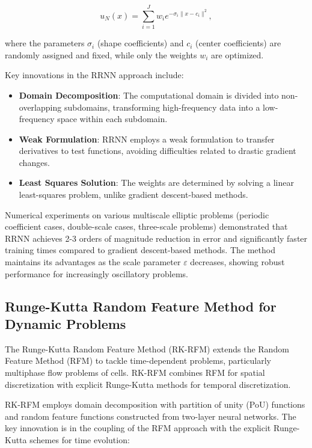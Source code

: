\documentclass[11pt]{article}
\begin{document}
\begin{equation}
    u_N(x) = \sum_{i=1}^J w_i e^{-\sigma_i\|x-c_i\|^2},
\end{equation}

where the parameters $\sigma_i$ (shape coefficients) and $c_i$ (center coefficients) are randomly assigned and fixed, while only the weights $w_i$ are optimized.

Key innovations in the RRNN approach include:
\begin{itemize}
    \item \textbf{Domain Decomposition}: The computational domain is divided into non-overlapping subdomains, transforming high-frequency data into a low-frequency space within each subdomain.
    
    \item \textbf{Weak Formulation}: RRNN employs a weak formulation to transfer derivatives to test functions, avoiding difficulties related to drastic gradient changes.
    
    \item \textbf{Least Squares Solution}: The weights are determined by solving a linear least-squares problem, unlike gradient descent-based methods.
\end{itemize}

Numerical experiments on various multiscale elliptic problems (periodic coefficient cases, double-scale cases, three-scale problems) demonstrated that RRNN achieves 2-3 orders of magnitude reduction in error and significantly faster training times compared to gradient descent-based methods. The method maintains its advantages as the scale parameter $\varepsilon$ decreases, showing robust performance for increasingly oscillatory problems.

\subsection{Runge-Kutta Random Feature Method for Dynamic Problems}

The Runge-Kutta Random Feature Method (RK-RFM) \citep{Deng2023} extends the Random Feature Method (RFM) to tackle time-dependent problems, particularly multiphase flow problems of cells. RK-RFM combines RFM for spatial discretization with explicit Runge-Kutta methods for temporal discretization.

RK-RFM employs domain decomposition with partition of unity (PoU) functions and random feature functions constructed from two-layer neural networks. The key innovation is in the coupling of the RFM approach with the explicit Runge-Kutta schemes for time evolution:
\end{document}
